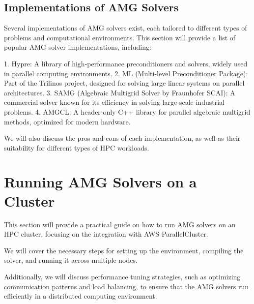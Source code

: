 \subsection{Implementations of AMG Solvers}
Several implementations of AMG solvers exist, each tailored to different types of problems and computational environments. This section will provide a list of popular AMG solver implementations, including:

1. Hypre: A library of high-performance preconditioners and solvers, widely used in parallel computing environments.
2. ML (Multi-level Preconditioner Package): Part of the Trilinos project, designed for solving large linear systems on parallel architectures.
3. SAMG (Algebraic Multigrid Solver by Fraunhofer SCAI): A commercial solver known for its efficiency in solving large-scale industrial problems.
4. AMGCL: A header-only C++ library for parallel algebraic multigrid methods, optimized for modern hardware.

We will also discuss the pros and cons of each implementation, as well as their suitability for different types of HPC workloads.

\section{Running AMG Solvers on a Cluster}
This section will provide a practical guide on how to run AMG solvers on an HPC cluster, focusing on the integration with AWS ParallelCluster. 

We will cover the necessary steps for setting up the environment, compiling the solver, and running it across multiple nodes. 

Additionally, we will discuss performance tuning strategies, such as optimizing communication patterns and load balancing, to ensure that the AMG solvers run efficiently in a distributed computing environment.